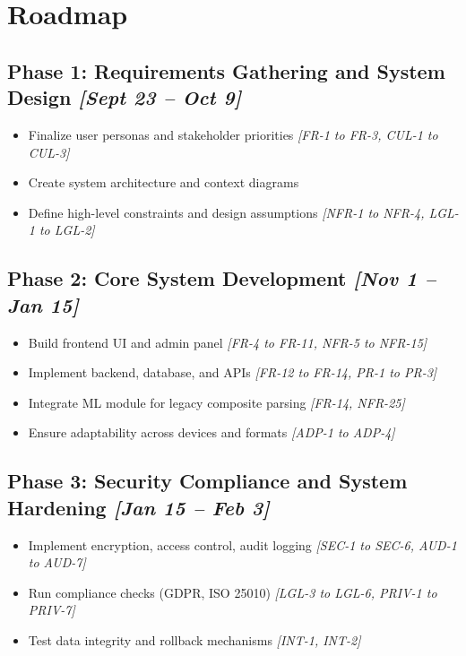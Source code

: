 \documentclass{article}
\begin{document}
\section{Roadmap}

\subsection*{Phase 1: Requirements Gathering and System Design \hfill \textit{[Sept 23 – Oct 9]}}

\begin{itemize}
  \item Finalize user personas and stakeholder priorities \hfill \textit{[FR-1 to FR-3, CUL-1 to CUL-3]}
  \item Create system architecture and context diagrams \hfill 
  \item Define high-level constraints and design assumptions \hfill \textit{[NFR-1 to NFR-4, LGL-1 to LGL-2]}
\end{itemize}

\subsection*{Phase 2: Core System Development \hfill \textit{[Nov 1 – Jan 15]}}

\begin{itemize}
  \item Build frontend UI and admin panel \hfill \textit{[FR-4 to FR-11, NFR-5 to NFR-15]}
  \item Implement backend, database, and APIs \hfill \textit{[FR-12 to FR-14, PR-1 to PR-3]}
  \item Integrate ML module for legacy composite parsing \hfill \textit{[FR-14, NFR-25]}
  \item Ensure adaptability across devices and formats \hfill \textit{[ADP-1 to ADP-4]}
\end{itemize}

\subsection*{Phase 3: Security Compliance and System Hardening \hfill \textit{[Jan 15 – Feb 3]}}

\begin{itemize}
  \item Implement encryption, access control, audit logging \hfill \textit{[SEC-1 to SEC-6, AUD-1 to AUD-7]}
  \item Run compliance checks (GDPR, ISO 25010) \hfill \textit{[LGL-3 to LGL-6, PRIV-1 to PRIV-7]}
  \item Test data integrity and rollback mechanisms \hfill \textit{[INT-1, INT-2]}
\end{itemize}
\end{document}
